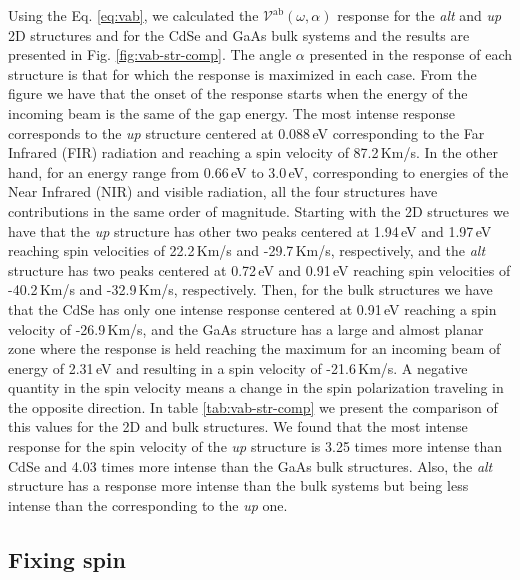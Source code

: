 \documentclass[prb,11pt,tightenlines,twocolumn,aps]{revtex4-1}
\begin{document}
Using the Eq. \eqref{eq:vab}, we calculated the
$\mathcal{V}^{\mathrm{ab}}(\omega,\alpha)$ response for the \emph{alt} and
\emph{up} 2D structures and for the CdSe and GaAs bulk systems and the results
are presented in Fig. \ref{fig:vab-str-comp}. The angle $\alpha$ presented in
the response of each structure is that for which the response is maximized in
each case.
% 
From the figure we have that the onset of the response starts when the energy of
the incoming beam is the same of the gap energy.
% 
The most intense response corresponds to the \emph{up} structure centered at
0.088\,eV corresponding to the Far Infrared (FIR) radiation and reaching a spin
velocity of 87.2\,Km/s.
% 
In the other hand, for an energy range from 0.66\,eV to 3.0\,eV, corresponding
to energies of the Near Infrared (NIR) and visible radiation, all the four
structures have contributions in the same order of magnitude.
% 
Starting with the 2D structures we have that the \emph{up} structure has other
two peaks centered at 1.94\,eV and 1.97\,eV reaching spin velocities of
22.2\,Km/s and -29.7\,Km/s, respectively, and the \emph{alt} structure has two
peaks centered at 0.72\,eV and 0.91\,eV reaching spin velocities of -40.2\,Km/s
and -32.9\,Km/s, respectively.
% 
Then, for the bulk structures we have that the CdSe has only one intense
response centered at 0.91\,eV reaching a spin velocity of -26.9\,Km/s, and the
GaAs structure has a large and almost planar zone where the response is held
reaching the maximum for an incoming beam of energy of 2.31\,eV and resulting in
a spin velocity of -21.6\,Km/s.
% 
A negative quantity in the spin velocity means a change in the spin polarization
traveling in the opposite direction.
% 
In table \ref{tab:vab-str-comp} we present the comparison of this values for the
2D and bulk structures. We found that the most intense response for the spin
velocity of the \emph{up} structure is 3.25 times more intense than CdSe and
4.03 times more intense than the GaAs bulk structures. Also, the \emph{alt}
structure has a response more intense than the bulk systems but being less
intense than the corresponding to the \emph{up} one.
% 




\subsection{Fixing spin} %
\label{sec:res-fixspin}
\end{document}
